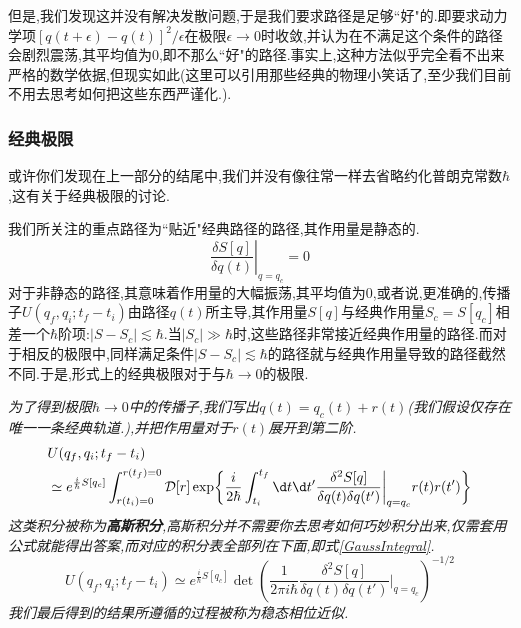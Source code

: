 但是,我们发现这并没有解决发散问题,于是我们要求路径是足够``好"的.即要求动力学项$[q(t+\epsilon)-q(t)]^2/\epsilon$在极限$\epsilon\to0$时收敛,并认为在不满足这个条件的路径会剧烈震荡,其平均值为$ 0 $,即不那么``好"的路径.事实上,这种方法似乎完全看不出来严格的数学依据,但现实如此(这里可以引用那些经典的物理小笑话了,至少我们目前不用去思考如何把这些东西严谨化.).

\subsubsection{经典极限}
或许你们发现在上一部分的结尾中,我们并没有像往常一样去省略约化普朗克常数$\hbar$,这有关于经典极限的讨论.

我们所关注的重点路径为``贴近"经典路径的路径,其作用量是静态的.
\begin{equation}
    \left.\frac{\delta S[q]}{\delta q(t)}\right|_{q=q_c}=0
\end{equation}
对于非静态的路径,其意味着作用量的大幅振荡,其平均值为0,或者说,更准确的,传播子$U(q_f,q_i;t_f-t_i)$由路径$q(t)$所主导,其作用量$S[q]$与经典作用量$S_c=S[q_c]$相差一个$\hbar$阶项:$|S-S_c|\lesssim\hbar$.当$|S_c|\gg\hbar $时,这些路径非常接近经典作用量的路径.而对于相反的极限中,同样满足条件$|S-S_c|\lesssim\hbar$的路径就与经典作用量导致的路径截然不同.于是,形式上的经典极限对于与$\hbar\to0$的极限.

\begin{remark}
    \textit{为了得到极限$\hbar\to0$中的传播子,我们写出$q(t)=q_c(t)+r(t)$(我们假设仅存在唯一一条经典轨道.),并把作用量对于$r(t)$展开到第二阶.}
    \begin{equation}
        \begin{aligned}&U(q_f,q_i;t_f-t_i)\\&\simeq e^{\frac{i}{\hbar}S[q_c]}\int_{r(t_i)=0}^{r(t_f)=0}\mathcal{D}[r]\exp\biggl\{\frac{i}{2\hbar}\int_{t_i}^{t_f}\d t \d t' \frac{\delta^2S[q]}{\delta q(t)\delta q(t')}\biggr|_{q=q_c}r(t)r(t')\biggr\}\end{aligned}
    \end{equation}
    \textit{这类积分被称为\textbf{高斯积分},高斯积分并不需要你去思考如何巧妙积分出来,仅需套用公式就能得出答案,而对应的积分表全部列在下面,即式\ref{GaussIntegral}.}
    \begin{equation}
        U(q_f,q_i;t_f-t_i)\simeq e^{\frac{i}{\hbar}S[q_c]}\det\left(\frac{1}{2\pi i\hbar}\frac{\delta^2S[q]}{\delta q(t)\delta q(t')}\bigg|_{q=q_c}\right)^{-1/2}
    \end{equation}
    \textit{我们最后得到的结果所遵循的过程被称为稳态相位近似.}
\end{remark}
